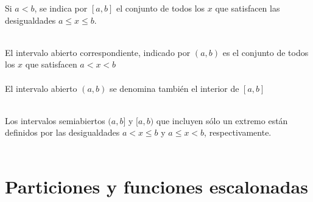     \begin{tcolorbox}[colframe=white]

        \begin{def.}
	    Si $a<b$, se indica por $\left[a,b\right]$ el conjunto de todos los $x$ que satisfacen las desigualdades $a\leq x \leq b$.\\\\
        \end{def.}

	\begin{def.}
	    El intervalo abierto correspondiente, indicado por $(a,b)$ es el conjunto de todos los $x$ que satisfacen $a<x<b$\\\\
	    El intervalo abierto $(a,b)$ se denomina también el interior de $\left[a,b\right]$ \\\\
	\end{def.}

	\begin{def.}
	    Los intervalos semiabiertos $(a,b]$ y $[a,b)$ que incluyen sólo un extremo están definidos por las desigualdades $a<x\leq b$ y $a\leq x <b$, respectivamente.\\\\
	\end{def.}

    \end{tcolorbox}

\section{Particiones y funciones escalonadas}

